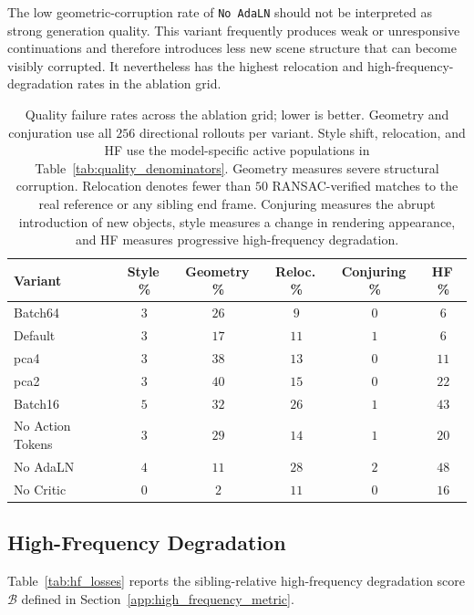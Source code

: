 \documentclass[letterpaper]{article} %
\begin{document}
The low geometric-corruption rate of \texttt{No AdaLN} should not be
interpreted as strong generation quality. This variant frequently produces
weak or unresponsive continuations and therefore introduces less new scene
structure that can become visibly corrupted. It nevertheless has the highest
relocation and high-frequency-degradation rates in the ablation grid.

\begin{table}[t]
\centering
{
\small
\setlength{\tabcolsep}{4pt}
\begin{tabular}{lccccc}
\toprule
Variant & Style\,\% & Geometry\,\% & Reloc.\,\% & Conjuring\,\% & HF\,\% \\
\midrule
Batch64          & $3$ & $26$ & $9$  & $0$   & $6$  \\
Default          & $3$ & $17$ & $11$ & $1$   & $6$  \\
pca4             & $3$ & $38$ & $13$ & $0$ & $11$ \\
pca2             & $3$ & $40$ & $15$ & $0$   & $22$ \\
Batch16          & $5$ & $32$ & $26$ & $1$ & $43$ \\
No Action Tokens & $3$ & $29$ & $14$ & $1$   & $20$ \\
No AdaLN         & $4$ & $11$ & $28$ & $2$ & $48$ \\
No Critic        & $0$ & $2$  & $11$ & $0$ & $16$ \\
\bottomrule
\end{tabular}
}
\caption{
    Quality failure rates across the ablation grid; lower is better. Geometry
    and conjuration use all $256$ directional rollouts per variant. Style
    shift, relocation, and HF use the model-specific active populations in
    Table~\ref{tab:quality_denominators}. Geometry measures severe structural
    corruption. Relocation denotes fewer than $50$ RANSAC-verified matches to
    the real reference or any sibling end frame. Conjuring measures the abrupt
    introduction of new objects, style measures a change in rendering
    appearance, and HF measures progressive high-frequency degradation.
}
\label{tab:quality_ablation}
\end{table}

\subsection{High-Frequency Degradation}
\label{app:high_frequency_results}

Table~\ref{tab:hf_losses} reports the sibling-relative high-frequency
degradation score $\mathcal B$ defined in
Section~\ref{app:high_frequency_metric}.
\end{document}
